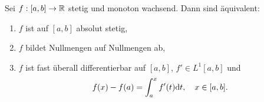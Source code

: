 Sei $f:[a,b]\to\mathbb{R}$ stetig und monoton wachsend. Dann sind äquivalent:
\begin{enumerate}
\pause \item $f$ ist auf $[a,b]$ absolut stetig,
\pause \item $f$ bildet Nullmengen auf Nullmengen ab,
\pause\item $f$ ist fast überall differentierbar auf $[a,b]$, \pause $f'\in L^1[a,b]$ \pause und
\begin{equation*}
    f(x)-f(a)=\int_a^x f'(t) \mathrm{d} t, \quad x\in[a,b].
\end{equation*}
\end{enumerate}